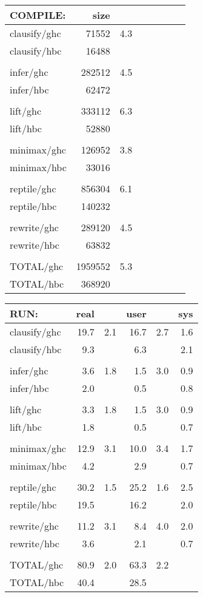 \begin{slide}{}
\begin{center}
\begin{tabular}{lrrrrrrr}
COMPILE:    & size \\ \hline
clausify/ghc&   71552&  4.3\\
clausify/hbc&   16488\\
\\
infer/ghc&  282512&  4.5\\
infer/hbc&   62472\\
\\
lift/ghc&  333112&  6.3\\
lift/hbc&   52880\\
\\
minimax/ghc&  126952&  3.8\\
minimax/hbc&   33016\\
\\
reptile/ghc&  856304&  6.1\\
reptile/hbc&  140232\\
\\
rewrite/ghc&  289120&  4.5\\
rewrite/hbc&   63832\\
\\
TOTAL/ghc& 1959552&  5.3\\
TOTAL/hbc&  368920
\end{tabular}
\end{center}
\end{slide}

\begin{slide}{}
\begin{center}
\begin{tabular}{lrrrrr}
RUN: & real && user && sys \\ \hline
clausify/ghc& 19.7&  2.1& 16.7&  2.7& 1.6\\
clausify/hbc&  9.3&&  6.3&& 2.1\\
\\
infer/ghc&  3.6&  1.8&  1.5&  3.0& 0.9\\
infer/hbc&  2.0&&  0.5&& 0.8\\
\\
lift/ghc&  3.3&  1.8&  1.5&  3.0& 0.9\\
lift/hbc&  1.8&&  0.5&& 0.7\\
\\
minimax/ghc& 12.9&  3.1& 10.0&  3.4& 1.7\\
minimax/hbc&  4.2&&  2.9&& 0.7\\
\\
reptile/ghc& 30.2&  1.5& 25.2&  1.6& 2.5\\
reptile/hbc& 19.5&& 16.2&& 2.0\\
\\
rewrite/ghc& 11.2&  3.1&  8.4&  4.0& 2.0\\
rewrite/hbc&  3.6&&  2.1&& 0.7\\
\\
TOTAL/ghc& 80.9&  2.0& 63.3&  2.2\\
TOTAL/hbc& 40.4&& 28.5
\end{tabular}
\end{center}
\end{slide}

